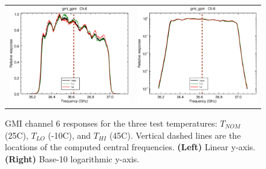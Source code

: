 \begin{figure}[htp]
  \centering
  \begin{tabular}{c c}
    \includegraphics[scale=0.3]{graphics/lin/gmi_gpm-6.eps} &
    \includegraphics[scale=0.3]{graphics/log/gmi_gpm-6.eps}
  \end{tabular}
  \caption{GMI channel 6 responses for the three test temperatures: $T_{NOM}$ (25\textdegree{}C), $T_{LO}$ (-10\textdegree{}C), and $T_{HI}$ (45\textdegree{}C). Vertical dashed lines are the locations of the computed central frequencies. \textbf{(Left)} Linear y-axis. \textbf{(Right)} Base-10 logarithmic y-axis.}
  \label{fig:ch6_response}
\end{figure}


